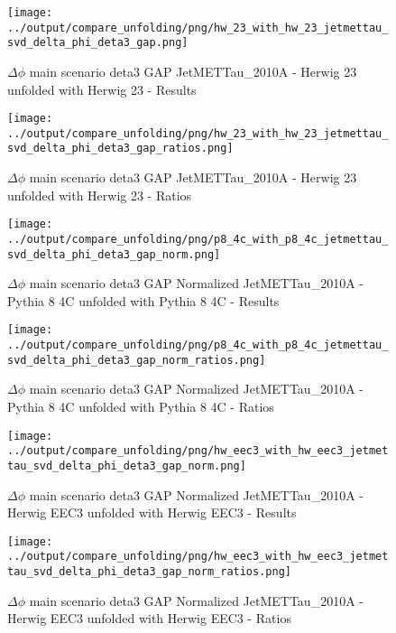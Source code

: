 \documentclass[11pt]{book}
\begin{document}
\begin{figure}[ht]
\centering
\texttt{[image: ../output/compare\_unfolding/png/hw\_23\_with\_hw\_23\_jetmettau\_svd\_delta\_phi\_deta3\_gap.png]}
\caption{$\Delta\phi$ main scenario deta3 GAP JetMETTau\_2010A - Herwig 23 unfolded with Herwig 23 - Results}
\label{hw_23_hw_23_jetmettau_svd_delta_phi_deta3_gap_a}
\end{figure}

\begin{figure}[ht]
\centering
\texttt{[image: ../output/compare\_unfolding/png/hw\_23\_with\_hw\_23\_jetmettau\_svd\_delta\_phi\_deta3\_gap\_ratios.png]}
\caption{$\Delta\phi$ main scenario deta3 GAP JetMETTau\_2010A - Herwig 23 unfolded with Herwig 23 - Ratios}
\label{hw_23_hw_23_jetmettau_svd_delta_phi_deta3_gap_b}
\end{figure}


\begin{figure}[ht]
\centering
\texttt{[image: ../output/compare\_unfolding/png/p8\_4c\_with\_p8\_4c\_jetmettau\_svd\_delta\_phi\_deta3\_gap\_norm.png]}
\caption{$\Delta\phi$ main scenario deta3 GAP Normalized JetMETTau\_2010A - Pythia 8 4C unfolded with Pythia 8 4C - Results}
\label{p8_p8_jetmettau_svd_delta_phi_deta3_gap_norm_a}
\end{figure}

\begin{figure}[ht]
\centering
\texttt{[image: ../output/compare\_unfolding/png/p8\_4c\_with\_p8\_4c\_jetmettau\_svd\_delta\_phi\_deta3\_gap\_norm\_ratios.png]}
\caption{$\Delta\phi$ main scenario deta3 GAP Normalized JetMETTau\_2010A - Pythia 8 4C unfolded with Pythia 8 4C - Ratios}
\label{p8_p8_jetmettau_svd_delta_phi_deta3_gap_norm_b}
\end{figure}

\begin{figure}[ht]
\centering
\texttt{[image: ../output/compare\_unfolding/png/hw\_eec3\_with\_hw\_eec3\_jetmettau\_svd\_delta\_phi\_deta3\_gap\_norm.png]}
\caption{$\Delta\phi$ main scenario deta3 GAP Normalized JetMETTau\_2010A - Herwig EEC3 unfolded with Herwig EEC3 - Results}
\label{hw_eec3_hw_eec3_jetmettau_svd_delta_phi_deta3_gap_norm_a}
\end{figure}

\begin{figure}[ht]
\centering
\texttt{[image: ../output/compare\_unfolding/png/hw\_eec3\_with\_hw\_eec3\_jetmettau\_svd\_delta\_phi\_deta3\_gap\_norm\_ratios.png]}
\caption{$\Delta\phi$ main scenario deta3 GAP Normalized JetMETTau\_2010A - Herwig EEC3 unfolded with Herwig EEC3 - Ratios}
\label{hw_eec3_hw_eec3_jetmettau_svd_delta_phi_deta3_gap_norm_b}
\end{figure}
\end{document}
